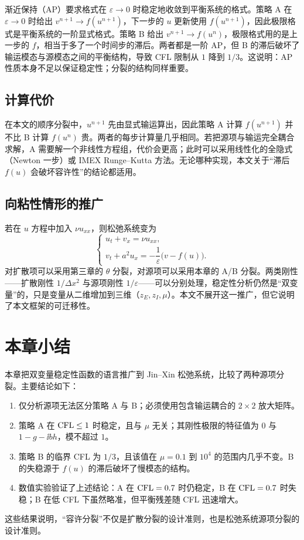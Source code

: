 渐近保持（AP）要求格式在 $\varepsilon\to0$ 时稳定地收敛到平衡系统的格式。策略 A 在 $\varepsilon\to0$ 时给出 $v^{n+1}\to f(u^{n+1})$，下一步的 $u$ 更新使用 $f(u^{n+1})$，因此极限格式是平衡系统的一阶显式格式。策略 B 给出 $v^{n+1}\to f(u^n)$，极限格式用的是上一步的 $f$，相当于多了一个时间步的滞后。两者都是一阶 AP，但 B 的滞后破坏了输运模态与源模态之间的平衡结构，导致 CFL 限制从 $1$ 降到 $1/3$。这说明：AP 性质本身不足以保证稳定性；分裂的结构同样重要。

\subsection{计算代价}

在本文的顺序分裂中，$u^{n+1}$ 先由显式输运算出，因此策略 A 计算 $f(u^{n+1})$ 并不比 B 计算 $f(u^n)$ 贵。两者的每步计算量几乎相同。若把源项与输运完全耦合求解，A 需要解一个非线性方程组，代价会更高；此时可以采用线性化的全隐式（Newton 一步）或 IMEX Runge--Kutta 方法。无论哪种实现，本文关于“滞后 $f(u)$ 会破坏容许性”的结论都适用。

\subsection{向粘性情形的推广}

若在 $u$ 方程中加入 $\nu u_{xx}$，则松弛系统变为
\begin{equation}
  \begin{cases}
    u_t+v_x=\nu u_{xx},\\[4pt]
    v_t+a^2u_x=-\dfrac{1}{\varepsilon}\bigl(v-f(u)\bigr).
  \end{cases}
  \label{eq:jinxin-viscous}
\end{equation}
对扩散项可以采用第三章的 $\theta$ 分裂，对源项可以采用本章的 A/B 分裂。两类刚性——扩散刚性 $1/\Delta x^2$ 与源项刚性 $1/\varepsilon$——可以分别处理，稳定性分析仍然是“双变量”的，只是变量从二维增加到三维（$z_E,z_I,\mu$）。本文不展开这一推广，但它说明了本文框架的可迁移性。

\section{本章小结}

本章把双变量稳定性函数的语言推广到 Jin--Xin 松弛系统，比较了两种源项分裂。主要结论如下：
\begin{enumerate}[label=(\arabic*),leftmargin=2.4em]
  \item 仅分析源项无法区分策略 A 与 B；必须使用包含输运耦合的 $2\times2$ 放大矩阵。
  \item 策略 A 在 $\mathrm{CFL}\le1$ 时稳定，且与 $\mu$ 无关；其刚性极限的特征值为 $0$ 与 $1-g-\ii bh$，模不超过 $1$。
  \item 策略 B 的临界 CFL 为 $1/3$，且该值在 $\mu=0.1$ 到 $10^{4}$ 的范围内几乎不变。B 的失稳源于 $f(u)$ 的滞后破坏了慢模态的结构。
  \item 数值实验验证了上述结论：A 在 $\mathrm{CFL}=0.7$ 时仍稳定，B 在 $\mathrm{CFL}=0.7$ 时失稳；B 在低 CFL 下虽然略准，但平衡残差随 CFL 迅速增大。
\end{enumerate}
这些结果说明，“容许分裂”不仅是扩散分裂的设计准则，也是松弛系统源项分裂的设计准则。
